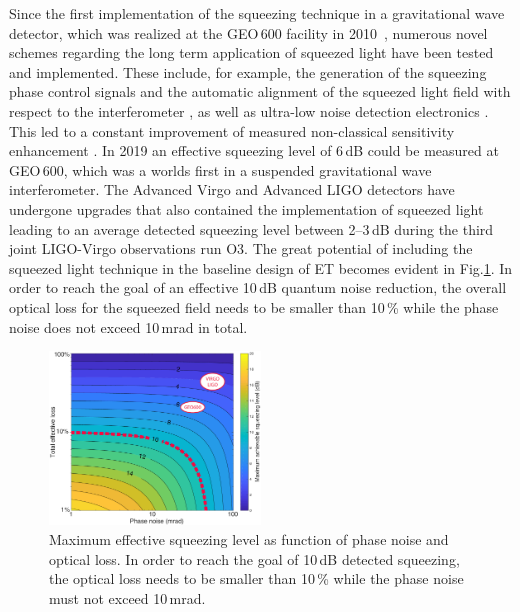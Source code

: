 
Since the first implementation of the squeezing technique in a gravitational wave detector, which was realized at the GEO\,600 facility in 2010~\cite{GEOsqueezing}, numerous novel schemes regarding the long term application of squeezed light have been tested and implemented. These include, for example, the generation of the squeezing phase control signals \cite{Dooley2015} and the automatic alignment of the squeezed light field with respect to the interferometer \cite{Schreiber2016}, as well as ultra-low noise detection electronics \cite{Grote2016}. This led to a constant improvement of measured non-classical sensitivity enhancement \cite {Grote2013,Dooley2016}. In 2019 an effective squeezing level of 6\,dB could be measured at GEO\,600, which was a worlds first in a suspended gravitational wave interferometer. 
The Advanced Virgo and Advanced LIGO detectors have undergone upgrades that also contained the implementation of squeezed light leading to an average detected squeezing level between 2--3\,dB during the third joint LIGO-Virgo observations run O3. 
%
The great potential of including the squeezed light technique in the baseline design of ET becomes evident in Fig.\ref{QNSQZvsPNandloss}. In order to reach the goal of an effective 10\,dB quantum noise reduction, the overall optical loss for the squeezed field needs to be smaller than 10\,\% while the phase noise does not exceed 10\,mrad in total. 
%
\begin{figure}
	\centering
		\includegraphics[width=0.5\textwidth]{./Detector/DetFigures/QNSQZvsPNandLoss.pdf}
	\caption{Maximum effective squeezing level as function of phase noise and optical loss. In order to reach the goal of 10\,dB detected squeezing, the optical loss needs to be smaller than 10\,\% while the phase noise must not exceed 10\,mrad.}
	\label{QNSQZvsPNandloss}
\end{figure}
%
